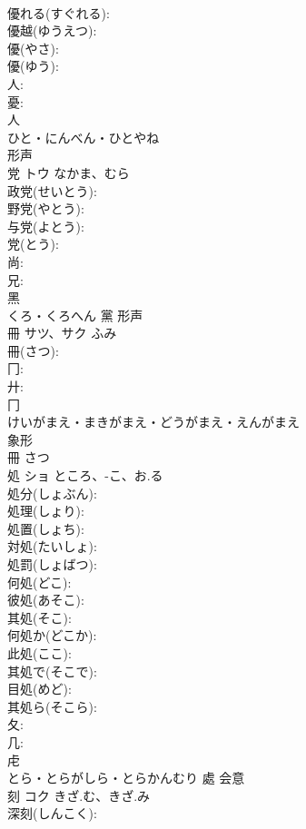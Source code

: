 \documentclass[8pt]{extreport}
\begin{document}
\begin{CJK}{UTF8}{min}
\\	優れる(すぐれる): 
\\	優越(ゆうえつ): 
\\	優(やさ): 
\\	優(ゆう): 
\\	人: 
\\	憂: 
\\	人	
\\	ひと・にんべん・ひとやね	
\\	形声 
\\	党	トウ	なかま、むら		
\\	政党(せいとう): 
\\	野党(やとう): 
\\	与党(よとう): 
\\	党(とう): 
\\	尚: 
\\	兄: 
\\	黑	
\\	くろ・くろへん	黨	形声 
\\	冊	サツ、サク	ふみ		
\\	冊(さつ): 
\\	冂: 
\\	廾: 
\\	冂	
\\	けいがまえ・まきがまえ・どうがまえ・えんがまえ	
\\	象形 
\\	冊 さつ 
\\	処	ショ	ところ、-こ、お.る		
\\	処分(しょぶん): 
\\	処理(しょり): 
\\	処置(しょち): 
\\	対処(たいしょ): 
\\	処罰(しょばつ): 
\\	何処(どこ): 
\\	彼処(あそこ): 
\\	其処(そこ): 
\\	何処か(どこか): 
\\	此処(ここ): 
\\	其処で(そこで): 
\\	目処(めど): 
\\	其処ら(そこら): 
\\	夂: 
\\	几: 
\\	虍	
\\	とら・とらがしら・とらかんむり	處	会意 
\\	刻	コク	きざ.む、きざ.み		
\\	深刻(しんこく): 

\end{CJK}
\end{document}
